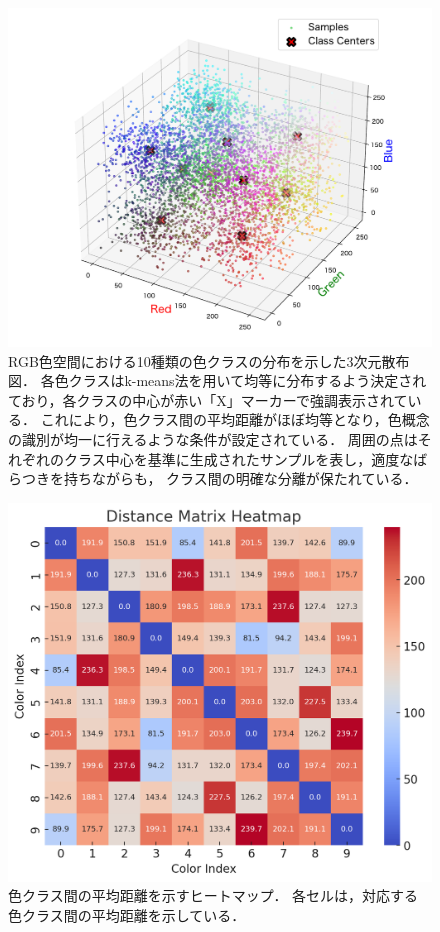 \begin{figure}[H]
    \centering
    \includegraphics[width=1\columnwidth]{fig/DistributionColors.pdf}
    \caption[RGB色空間における10種類の色クラスの分布を示した3次元散布図]{
        RGB色空間における10種類の色クラスの分布を示した3次元散布図．
        各色クラスはk-means法を用いて均等に分布するよう決定されており，各クラスの中心が赤い「X」マーカーで強調表示されている．
        これにより，色クラス間の平均距離がほぼ均等となり，色概念の識別が均一に行えるような条件が設定されている．
        周囲の点はそれぞれのクラス中心を基準に生成されたサンプルを表し，適度なばらつきを持ちながらも，
        クラス間の明確な分離が保たれている．
    }
    \label{fig:DistributionColors}
\end{figure}

\begin{figure}[H]
    \centering
    \includegraphics[width=\columnwidth]{tables/Distance_Matrix_Heatmap_color.png}
    \caption[色クラス間の平均距離を示すヒートマップ]{
        色クラス間の平均距離を示すヒートマップ．
        各セルは，対応する色クラス間の平均距離を示している．
    }
    \label{fig:color_class_distance}
\end{figure}

